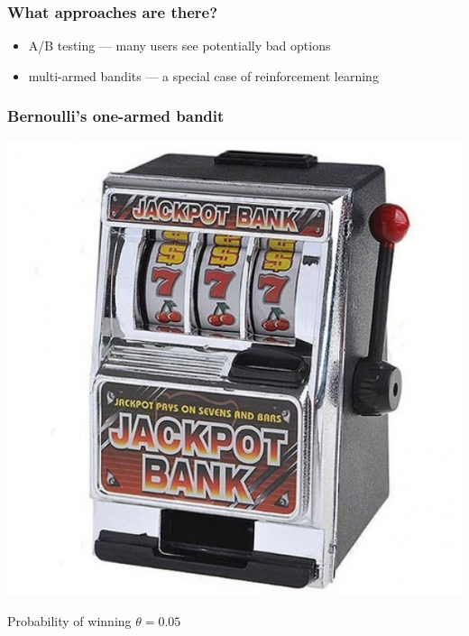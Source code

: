 \documentclass[fullscreen=true, bookmarks=true, hyperref={pdfencoding=unicode}]{beamer}
\begin{document}
\begin{frame}
  \frametitle{What approaches are there?}

  \begin{itemize}
    \item A/B testing — many users see potentially bad options
    \item multi-armed bandits — a special case of reinforcement learning
  \end{itemize}
\end{frame}


\begin{frame}
  \frametitle{Bernoulli's one-armed bandit}

  \begin{center}
    \includegraphics[keepaspectratio,
                     width=.5\paperwidth]{data-kopilkabandit.jpg}

    Probability of winning $\theta = 0.05$
  \end{center}

\end{frame}
\end{document}
